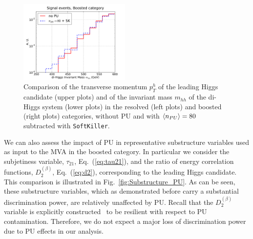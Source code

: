\begin{figure}[t]
\begin{center}
  \includegraphics[width=0.49\textwidth]{plots/m_HH_C2_bst_comp.pdf}
  \caption{\small
    Comparison of the transverse momentum $p_T^h$ of the leading
    Higgs candidate (upper plots) and of the invariant mass $m_{hh}$
    of the di-Higgs system (lower plots) in the resolved
    (left plots) and boosted (right plots) categories,
    without PU and with $\left\langle n_{PU}\right\rangle=80$ subtracted with {\tt SoftKiller}.
}
\label{fig:mHH_PU}
\end{center}
\end{figure}

We can also assess the impact of PU in representative
substructure variables
used as input to the MVA in the boosted category.
%
In particular we consider the subjetiness variable,
$\tau_{21}$, Eq.~(\ref{eq:tau21}), and the ratio
of energy correlation functions, $D_2^{(\beta)}$,
Eq.~(\ref{eq:d2}),
corresponding to the leading Higgs candidate.
%
This comparison is illustrated in Fig.~\ref{fig:Substructure_PU}.
%
As can be seen, these substructure variables, which
as demonstrated before carry a substantial
discrimination power, are relatively unaffected by PU.
%
Recall that the $D_2^{(\beta)}$ variable is
explicitly constructed~\cite{Larkoski:2013eya}
to be resilient
with respect to PU contamination.
%
Therefore, we do not expect a major loss of discrimination
power due to PU effects in our analysis.
%

